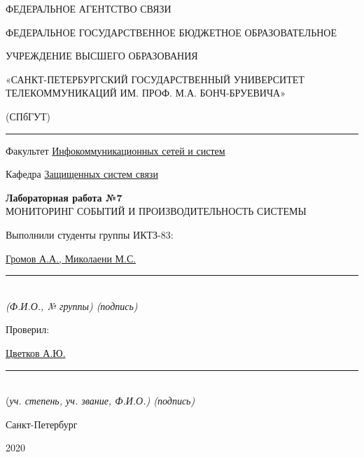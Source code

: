 \documentclass[a4paper,14pt]{extarticle}
\begin{document}
    \begin{center}
        \thispagestyle{empty}
        \begin{singlespace}
        ФЕДЕРАЛЬНОЕ АГЕНТСТВО СВЯЗИ

        ФЕДЕРАЛЬНОЕ ГОСУДАРСТВЕННОЕ БЮДЖЕТНОЕ ОБРАЗОВАТЕЛЬНОЕ

        УЧРЕЖДЕНИЕ ВЫСШЕГО ОБРАЗОВАНИЯ

        «САНКТ-ПЕТЕРБУРГСКИЙ ГОСУДАРСТВЕННЫЙ УНИВЕРСИТЕТ ТЕЛЕКОММУНИКАЦИЙ ИМ. ПРОФ. М.А. БОНЧ-БРУЕВИЧА»

        (СПбГУТ)
        \end{singlespace}
        \vspace{-1ex}
        \rule{\textwidth}{0.4pt}
        \vspace{-5ex}

        Факультет \underline{Инфокоммуникационных сетей и систем}

        Кафедра \underline{Защищенных систем связи}
        \vspace{10ex}

        \textbf{Лабораторная работа №7}\\
        МОНИТОРИНГ СОБЫТИЙ И ПРОИЗВОДИТЕЛЬНОСТЬ СИСТЕМЫ 


    \end{center}
    \vspace{4ex}
    \begin{flushright}
    \parbox{10 cm}{
    \begin{flushleft}
        Выполнили студенты группы ИКТЗ-83:

        \underline{Громов А.А., Миколаени М.С.} \hfill \rule[-0.85ex]{0.1\textwidth}{0.6pt}\\
        \vspace{-1ex}
        \footnotesize \textit{ (Ф.И.О., № группы) \hfill (подпись)} \normalsize

        Проверил:

        \underline{Цветков А.Ю.} \hfill \rule[-0.85ex]{0.1\textwidth}{0.6pt}\\
        \vspace{-1ex}
        (\footnotesize \textit{уч. степень, уч. звание, Ф.И.О.) \hfill (подпись)} \normalsize

    \end{flushleft}
    }
    \end{flushright}
    \begin{center}
        \vfill
        Санкт-Петербург

        2020

    \end{center}
    \newpage
\end{document}
